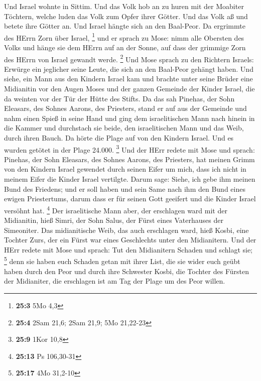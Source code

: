  Und Israel wohnte in Sittim. Und das Volk hob an zu huren
mit der Moabiter Töchtern,  welche luden das Volk zum
Opfer ihrer Götter. Und das Volk aß und betete ihre Götter an.
 Und Israel hängte sich an den Baal-Peor. Da ergrimmte des
HErrn Zorn über Israel, \footnote{\textbf{25:3} 5Mo 4,3} 
und er sprach zu Mose: nimm alle Obersten des Volks und hänge sie dem
HErrn auf an der Sonne, auf dass der grimmige Zorn des HErrn von Israel
gewandt werde. \footnote{\textbf{25:4} 2Sam 21,6; 2Sam 21,9; 5Mo
  21,22-23}  Und Mose sprach zu den Richtern Israels:
Erwürge ein jeglicher seine Leute, die sich an den Baal-Peor gehängt
haben.  Und siehe, ein Mann aus den Kindern Israel kam und
brachte unter seine Brüder eine Midianitin vor den Augen Moses und der
ganzen Gemeinde der Kinder Israel, die da weinten vor der Tür der Hütte
des Stifts.  Da das sah Pinehas, der Sohn Eleasars, des
Sohnes Aarons, des Priesters, stand er auf aus der Gemeinde und nahm
einen Spieß in seine Hand  und ging dem israelitischen
Mann nach hinein in die Kammer und durchstach sie beide, den
israelitischen Mann und das Weib, durch ihren Bauch. Da hörte die Plage
auf von den Kindern Israel.  Und es wurden getötet in der
Plage 24.000. \footnote{\textbf{25:9} 1Kor 10,8}  Und der
HErr redete mit Mose und sprach:  Pinehas, der Sohn
Eleasars, des Sohnes Aarons, des Priesters, hat meinen Grimm von den
Kindern Israel gewendet durch seinen Eifer um mich, dass ich nicht in
meinem Eifer die Kinder Israel vertilgte.  Darum sage:
Siehe, ich gebe ihm meinen Bund des Friedens;  und er
soll haben und sein Same nach ihm den Bund eines ewigen Priestertums,
darum dass er für seinen Gott geeifert und die Kinder Israel versöhnt
hat. \footnote{\textbf{25:13} Ps 106,30-31}  Der
israelitische Mann aber, der erschlagen ward mit der Midianitin, hieß
Simri, der Sohn Salus, der Fürst eines Vaterhauses der Simeoniter.
 Das midianitische Weib, das auch erschlagen ward, hieß
Kosbi, eine Tochter Zurs, der ein Fürst war eines Geschlechts unter den
Midianitern.  Und der HErr redete mit Mose und sprach:
 Tut den Midianitern Schaden und schlagt sie; \footnote{\textbf{25:17}
  4Mo 31,2-10}  denn sie haben euch Schaden getan mit
ihrer List, die sie wider euch geübt haben durch den Peor und durch ihre
Schwester Kosbi, die Tochter des Fürsten der Midianiter, die erschlagen
ist am Tag der Plage um des Peor willen.

